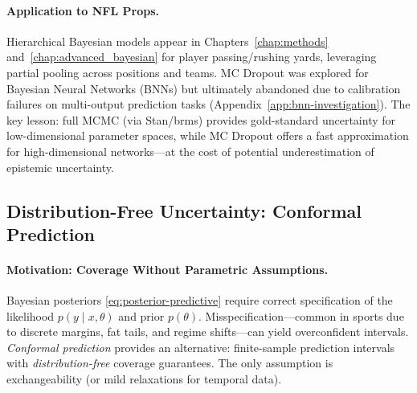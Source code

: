 \paragraph{Application to NFL Props.}
Hierarchical Bayesian models appear in Chapters~\ref{chap:methods} and~\ref{chap:advanced_bayesian} for player passing/rushing yards, leveraging partial pooling across positions and teams. MC Dropout was explored for Bayesian Neural Networks (BNNs) but ultimately abandoned due to calibration failures on multi-output prediction tasks (Appendix~\ref{app:bnn-investigation}). The key lesson: full MCMC (via Stan/brms) provides gold-standard uncertainty for low-dimensional parameter spaces, while MC Dropout offers a fast approximation for high-dimensional networks---at the cost of potential underestimation of epistemic uncertainty.

\subsection{Distribution-Free Uncertainty: Conformal Prediction}
\label{subsec:conformal-lit}

\paragraph{Motivation: Coverage Without Parametric Assumptions.}
Bayesian posteriors \eqref{eq:posterior-predictive} require correct specification of the likelihood $p(y\mid x,\theta)$ and prior $p(\theta)$. Misspecification---common in sports due to discrete margins, fat tails, and regime shifts---can yield overconfident intervals. \emph{Conformal prediction} \citep{vovk2005algorithmic, shafer2008tutorial} provides an alternative: finite-sample prediction intervals with \emph{distribution-free} coverage guarantees. The only assumption is exchangeability (or mild relaxations for temporal data).


